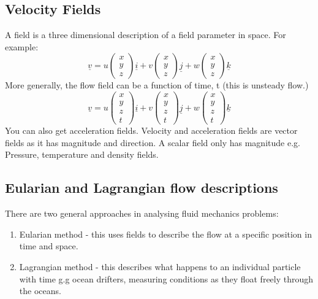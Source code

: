 \documentclass[class=report, crop=false, 12pt,a4paper]{standalone}
\begin{document}
\subsection{Velocity Fields}
A field is a three dimensional description of a field parameter in space. For example:
\[  
  \underline{v} = u
  \begin{pmatrix}
    x\\
    y\\
    z
  \end{pmatrix} \underline{i} + v
  \begin{pmatrix}
    x\\
    y\\
    z
  \end{pmatrix} \underline{j} + w
  \begin{pmatrix}
    x\\
    y\\
    z
  \end{pmatrix} \underline{k}
\]
More generally, the flow field can be a function of time, t (this is unsteady flow.)
\[  
  \underline{v} = u
  \begin{pmatrix}
    x\\
    y\\
    z\\
    t
  \end{pmatrix} \underline{i} + v
  \begin{pmatrix}
    x\\
    y\\
    z\\
    t
  \end{pmatrix} \underline{j} + w
  \begin{pmatrix}
    x\\
    y\\
    z\\
    t
  \end{pmatrix} \underline{k}
\]
You can also get acceleration fields. Velocity and acceleration fields are vector fields as it has magnitude and direction. A scalar field only has magnitude e.g. Pressure, temperature and density fields.
\subsection{Eularian and Lagrangian flow descriptions}
There are two general approaches in analysing fluid mechanics problems:
\begin{enumerate}[noitemsep]
  \item Eularian method - this uses fields to describe the flow at a specific position in time and space. 
  \item Lagrangian method - this describes what happens to an individual particle with time g.g ocean drifters, measuring conditions as they float freely through the oceans.
\end{enumerate}
\end{document}
